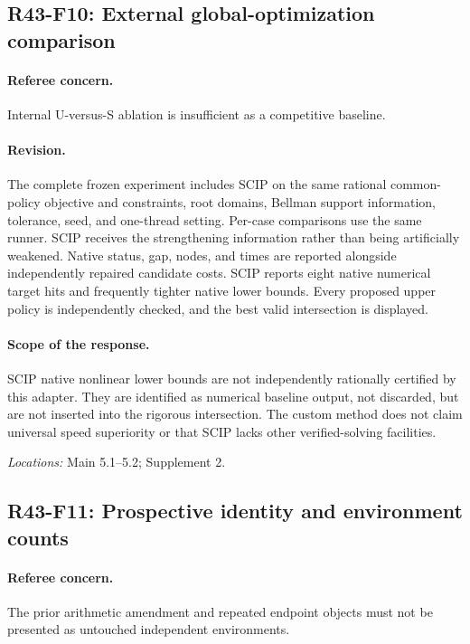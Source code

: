 \subsection{R43-F10: External global-optimization comparison}
\paragraph*{Referee concern.} Internal U-versus-S ablation is insufficient as a competitive baseline.

\paragraph*{Revision.} The complete frozen experiment includes SCIP on the same rational common-policy objective and constraints, root domains, Bellman support information, tolerance, seed, and one-thread setting. Per-case comparisons use the same runner. SCIP receives the strengthening information rather than being artificially weakened. Native status, gap, nodes, and times are reported alongside independently repaired candidate costs. SCIP reports eight native numerical target hits and frequently tighter native lower bounds. Every proposed upper policy is independently checked, and the best valid intersection is displayed.

\paragraph*{Scope of the response.} SCIP native nonlinear lower bounds are not independently rationally certified by this adapter. They are identified as numerical baseline output, not discarded, but are not inserted into the rigorous intersection. The custom method does not claim universal speed superiority or that SCIP lacks other verified-solving facilities.

\noindent\textit{Locations:} Main 5.1--5.2; Supplement 2.

\subsection{R43-F11: Prospective identity and environment counts}
\paragraph*{Referee concern.} The prior arithmetic amendment and repeated endpoint objects must not be presented as untouched independent environments.

